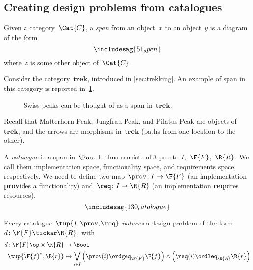 \subsection{Creating design problems from catalogues}
\begin{shaded*}
\begin{definition}[Span]
Given a category~$\Cat{C}$, a \emph{span} from an object~$x$ to an object~$y$ is a diagram of the form
\begin{equation}
\includesag{51_span}
\end{equation}
where~$z$ is some other object of~$\Cat{C}$. 
\end{definition}
\end{shaded*}
\begin{example}
Consider the category~$\mathbf{trek}$, introduced in \cref{sec:trekking}. An example of span in this category is reported in~\cref{fig:exmountains}.
\begin{figure}[h!]
\begin{center}
\end{center}
\caption{Swiss peaks can be thought of as a span in~$\mathbf{trek}$. \label{fig:exmountains}}
\end{figure}
Recall that \textsf{Matterhorn Peak}, \textsf{Jungfrau Peak}, and \textsf{Pilatus Peak} are objects of~$\mathbf{trek}$, and the arrows are morphisms in~$\mathbf{trek}$ (paths from one location to the other).
\end{example}

\begin{definition}[Catalogue] \label{def:catalogue}
A \emph{catalogue} is a span in~$\Pos$.
It thus consists of 3 posets~$I$,~$\F{F}$,~$\R{R}$.
We call them implementation space, functionality space, and requirements space, respectively. We need to define two map~$\prov \colon I \to \F{F}$ (an implementation \textbf{prov}ides a functionality) and~$\req\colon I \to \R{R}$ (an implementation \textbf{req}uires resources). 
\begin{equation}
\includesag{130_catalogue}
\end{equation}
\end{definition}

\begin{definition}
Every catalogue~$\tup{I,\prov,\req}$ \emph{induces} a design problem of the form~$d\colon \F{F}\tickar \R{R}$, with
\begin{equation}
    \begin{aligned}
    d\colon \F{F}\op \times \R{R}&\to \Bool\\
    \tup{\F{f}^*,\R{r}}&\mapsto \bigvee_{i\in I}\left(\prov(i)\ordgeq_{\F{F}}\F{f} \right)\wedge \left( \req(i)\ordleq_{\R{R}}\R{r}\right)
    \end{aligned}
\end{equation}
\end{definition}

